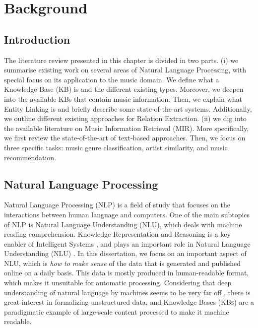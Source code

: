 
\chapter{Background}
\label{sec:SOA}

\section{Introduction}
\label{sec:SOA:Introduction}

The literature review presented in this chapter is divided in two parts.
(i) we summarise existing work on several areas of Natural Language Processing, with special focus on its application to the music domain. 
We define what a Knowledge Base (KB) is and the different existing types. Moreover, we deepen into the available KBs that contain music information.
Then, we explain what Entity Linking is and briefly describe some state-of-the-art systems. Additionally, we outline different existing approaches for Relation Extraction. 
(ii) we dig into the available literature on Music Information Retrieval (MIR). More specifically, we first review the state-of-the-art of text-based approaches. Then, we focus on three specific tasks: music genre classification, artist similarity, and music recommendation.


\section{Natural Language Processing}
\label{sec:SOA:nlu}

Natural Language Processing (NLP) is a field of study that focuses on the interactions between human language and computers. One of the main subtopics of NLP is Natural Language Understanding (NLU), which deals with machine reading comprehension.
Knowledge Representation and Reasoning is a key enabler of Intelligent Systems \cite{Suchaneketal2007}, and plays an important role in Natural Language Understanding (NLU) \cite{BaralandDeGiacomo2015}.
In this dissertation, we focus on an important aspect of NLU, which is \textit{how to make sense} of the data that is generated and published online on a daily basis. This data is mostly produced in human-readable format, which makes it unsuitable for automatic processing. Considering that deep understanding of natural language by machines seems to be very far off \cite{CambriaandWhite2014}, there is great interest in formalizing unstructured data, and Knowledge Bases (\textsc{KBs}) are a paradigmatic example of large-scale content processed to make it machine readable.

